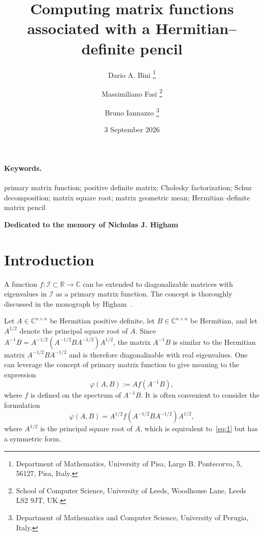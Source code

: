 \documentclass[DIV=14]{scrartcl}
\date{3 September 2026}
\title{Computing matrix functions associated with a Hermitian--definite pencil}
\author{%
  Dario A. Bini%
  \footnote{Department of Mathematics, University of Pisa, Largo B.
  Pontecorvo, 5, 56127, Pisa, Italy.}
  \and
  Massimiliano Fasi%
  \footnote{School of Computer Science, University of Leeds, Woodhouse Lane, Leeds
  LS2 9JT, UK.}
  \and
  Bruno Iannazzo%
  \footnote{Department of Mathematics and Computer Science, University of
  Perugia, Italy.}}
\date{}
\newcommand{\C}{\ensuremath{\mathbb C}}
\newcommand{\Cnn}{\ensuremath{\C^{n \times n}}}
\theoremstyle{thmstyletwo}
\theoremstyle{definition}
\numberwithin{equation}{section}
\newcommand{\deq}{\ensuremath{:=}}
\begin{document}
\maketitle


\paragraph{Keywords.} primary matrix function; positive definite matrix; Cholesky factorization; Schur decomposition; matrix square root; matrix geometric mean; Hermitian--definite matrix pencil

\bigskip
\begin{center}
\textbf{Dedicated to the memory of Nicholas J. Higham}
\end{center}

\section{Introduction}
\label{sec:intro}

A function $f:\mathcal I \subset \mathbb R \rightarrow \C$ can be extended to diagonalizable matrices with eigenvalues in $\mathcal I$ as a primary matrix function.
The concept is thoroughly discussed in the monograph by Higham~\cite{higham:book08}.

Let $A \in \Cnn$ be Hermitian positive definite, let $B \in \Cnn$ be Hermitian, and let $A^{1/2}$ denote the principal square root of $A$. Since $A^{-1}B=A^{-1/2}(A^{-1/2}BA^{-1/2})A^{1/2}$,  the matrix $A^{-1}B$ is similar to the Hermitian matrix $A^{-1/2}BA^{-1/2}$ and is therefore diagonalizable with real eigenvalues. One can leverage the concept of primary matrix function to give meaning to the expression
\begin{equation}\label{eq:1}
    \varphi(A,B) \deq{} Af(A^{-1}B),
\end{equation}
where $f$ is defined on the spectrum of $A^{-1}B$.
It is often convenient to consider the formulation
\begin{equation}\label{eq:2}
\varphi(A,B) = A^{1/2}f(A^{-1/2}BA^{-1/2})A^{1/2},
\end{equation}
where $A^{1/2}$ is the principal square root of $A$, which is equivalent to~\eqref{eq:1} but has a symmetric form.
\end{document}
